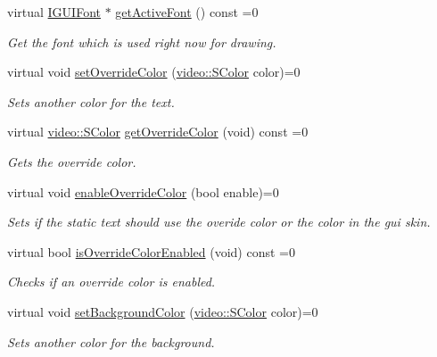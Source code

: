 \begin{DoxyCompactItemize}
virtual \hyperlink{classirr_1_1gui_1_1IGUIFont}{I\+G\+U\+I\+Font} $\ast$ \hyperlink{classirr_1_1gui_1_1IGUIStaticText_aef001eb5d0e13b5b6d1efead606605c2}{get\+Active\+Font} () const =0
\begin{DoxyCompactList}\small\item\em Get the font which is used right now for drawing. \end{DoxyCompactList}\item 
virtual void \hyperlink{classirr_1_1gui_1_1IGUIStaticText_aadc1f0e10e4b298944e6dcfd49e54009}{set\+Override\+Color} (\hyperlink{classirr_1_1video_1_1SColor}{video\+::\+S\+Color} color)=0
\begin{DoxyCompactList}\small\item\em Sets another color for the text. \end{DoxyCompactList}\item 
virtual \hyperlink{classirr_1_1video_1_1SColor}{video\+::\+S\+Color} \hyperlink{classirr_1_1gui_1_1IGUIStaticText_a9c4c43f262efd02a113da79bedb973e1}{get\+Override\+Color} (void) const =0
\begin{DoxyCompactList}\small\item\em Gets the override color. \end{DoxyCompactList}\item 
virtual void \hyperlink{classirr_1_1gui_1_1IGUIStaticText_ae1f432263d4c638b0441f8b993f301bc}{enable\+Override\+Color} (bool enable)=0
\begin{DoxyCompactList}\small\item\em Sets if the static text should use the overide color or the color in the gui skin. \end{DoxyCompactList}\item 
virtual bool \hyperlink{classirr_1_1gui_1_1IGUIStaticText_a67b17803b8ad73e8d687b23ad38db37e}{is\+Override\+Color\+Enabled} (void) const =0
\begin{DoxyCompactList}\small\item\em Checks if an override color is enabled. \end{DoxyCompactList}\item 
\mbox{\label{classirr_1_1gui_1_1IGUIStaticText_afe9b39a38851b8d4056a35e3d62996d6}} 
virtual void \hyperlink{classirr_1_1gui_1_1IGUIStaticText_afe9b39a38851b8d4056a35e3d62996d6}{set\+Background\+Color} (\hyperlink{classirr_1_1video_1_1SColor}{video\+::\+S\+Color} color)=0
\begin{DoxyCompactList}\small\item\em Sets another color for the background. \end{DoxyCompactList}\item 

\end{DoxyCompactItemize}
